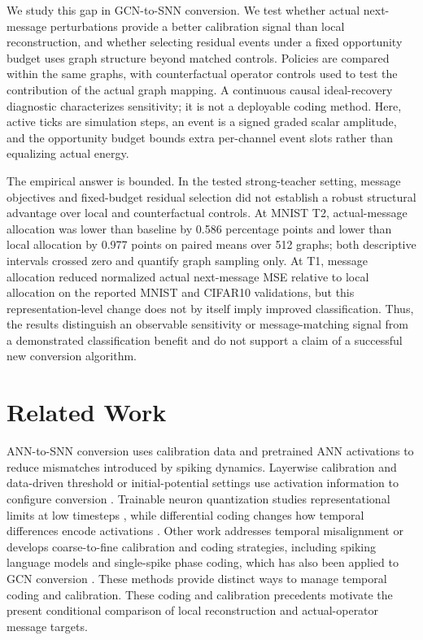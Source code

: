 \documentclass[11pt]{article}
\begin{document}
We study this gap in GCN-to-SNN conversion. We test whether actual next-message perturbations provide a better calibration signal than local reconstruction, and whether selecting residual events under a fixed opportunity budget uses graph structure beyond matched controls. Policies are compared within the same graphs, with counterfactual operator controls used to test the contribution of the actual graph mapping. A continuous causal ideal-recovery diagnostic characterizes sensitivity; it is not a deployable coding method. Here, active ticks are simulation steps, an event is a signed graded scalar amplitude, and the opportunity budget bounds extra per-channel event slots rather than equalizing actual energy.

The empirical answer is bounded. In the tested strong-teacher setting, message objectives and fixed-budget residual selection did not establish a robust structural advantage over local and counterfactual controls. At MNIST T2, actual-message allocation was lower than baseline by 0.586 percentage points and lower than local allocation by 0.977 points on paired means over 512 graphs; both descriptive intervals crossed zero and quantify graph sampling only. At T1, message allocation reduced normalized actual next-message MSE relative to local allocation on the reported MNIST and CIFAR10 validations, but this representation-level change does not by itself imply improved classification. Thus, the results distinguish an observable sensitivity or message-matching signal from a demonstrated classification benefit and do not support a claim of a successful new conversion algorithm.

\section{Related Work}

ANN-to-SNN conversion uses calibration data and pretrained ANN activations to reduce mismatches introduced by spiking dynamics. Layerwise calibration and data-driven threshold or initial-potential settings use activation information to configure conversion \citep{li2021,bojkovic2024}. Trainable neuron quantization studies representational limits at low timesteps \citep{atif2023}, while differential coding changes how temporal differences encode activations \citep{huang2025}. Other work addresses temporal misalignment \citep{bojkovic2025} or develops coarse-to-fine calibration and coding strategies, including spiking language models \citep{fas2025} and single-spike phase coding, which has also been applied to GCN conversion \citep{onespike2024}. These methods provide distinct ways to manage temporal coding and calibration. These coding and calibration precedents motivate the present conditional comparison of local reconstruction and actual-operator message targets.
\end{document}
